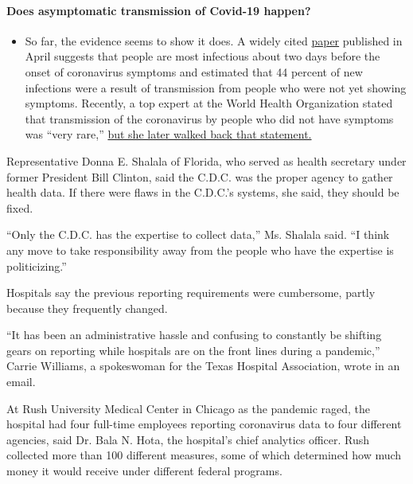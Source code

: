 \begin{itemize}
{  \paragraph{Does asymptomatic transmission of Covid-19
  happen?}\label{does-asymptomatic-transmission-of-covid-19-happen}}

  \begin{itemize}
  \tightlist
  \item
    So far, the evidence seems to show it does. A widely cited
    \href{https://www.nature.com/articles/s41591-020-0869-5}{paper}
    published in April suggests that people are most infectious about
    two days before the onset of coronavirus symptoms and estimated that
    44 percent of new infections were a result of transmission from
    people who were not yet showing symptoms. Recently, a top expert at
    the World Health Organization stated that transmission of the
    coronavirus by people who did not have symptoms was ``very rare,''
    \href{https://www.nytimes.com/2020/06/09/world/coronavirus-updates.html?action=click\&pgtype=Article\&state=default\&region=MAIN_CONTENT_3\&context=storylines_faq\#link-1f302e21}{but
    she later walked back that statement.}
  \end{itemize}
\end{itemize}

Representative Donna E. Shalala of Florida, who served as health
secretary under former President Bill Clinton, said the C.D.C. was the
proper agency to gather health data. If there were flaws in the C.D.C.'s
systems, she said, they should be fixed.

``Only the C.D.C. has the expertise to collect data,'' Ms. Shalala said.
``I think any move to take responsibility away from the people who have
the expertise is politicizing.''

Hospitals say the previous reporting requirements were cumbersome,
partly because they frequently changed.

``It has been an administrative hassle and confusing to constantly be
shifting gears on reporting while hospitals are on the front lines
during a pandemic,'' Carrie Williams, a spokeswoman for the Texas
Hospital Association, wrote in an email.

At Rush University Medical Center in Chicago as the pandemic raged, the
hospital had four full-time employees reporting coronavirus data to four
different agencies, said Dr. Bala N. Hota, the hospital's chief
analytics officer. Rush collected more than 100 different measures, some
of which determined how much money it would receive under different
federal programs.

